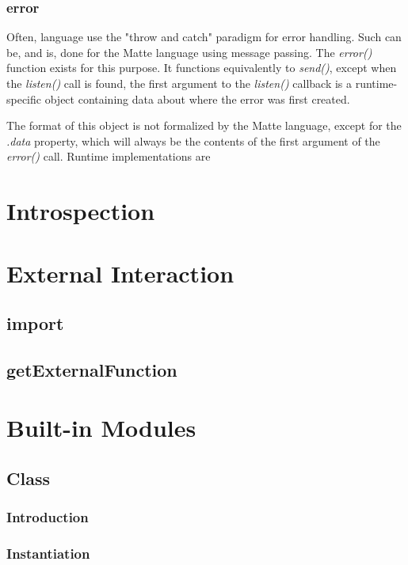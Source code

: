 \documentclass[12pt,letterpaper]{report}
\begin{document}
\subsection{error}\label{error}

Often, language use the "throw and catch" paradigm for error handling. Such can be, and is, done 
for the Matte language using message passing. The \textit{error()} function exists for this purpose. It functions 
equivalently to \textit{send()}, except when the \textit{listen()} call is found, the first argument 
to the \textit{listen()} callback is a runtime-specific object containing data about where the error 
was first created. 

The format of this object is not formalized by the Matte language, except for the 
\textit{.data} property, which will always be the contents of the first argument 
of the \textit{error()} call. Runtime implementations are 

\chapter{Introspection}\label{Introspection}
\chapter{External Interaction}\label{External Interaction}
\section{import}\label{import}
\section{getExternalFunction}\label{getExternalFunction}
\chapter{Built-in Modules}\label{Built-in Modules}
\section{Class}\label{Class}
\subsection{Introduction}\label{Introduction}
\subsection{Instantiation}\label{Instantiation}
\end{document}
